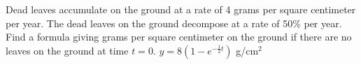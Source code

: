 {
Dead leaves accumulate on the ground at a rate of 4 grams per square centimeter per year.  The dead leaves on the ground decompose at a rate of 50\% per year. Find a formula giving grams per square centimeter on the ground if there are no leaves on the ground at time $t=0$.
}
{
$y = 8(1-e^{-\frac{1}{2}t})$ g/cm$^2$
}
